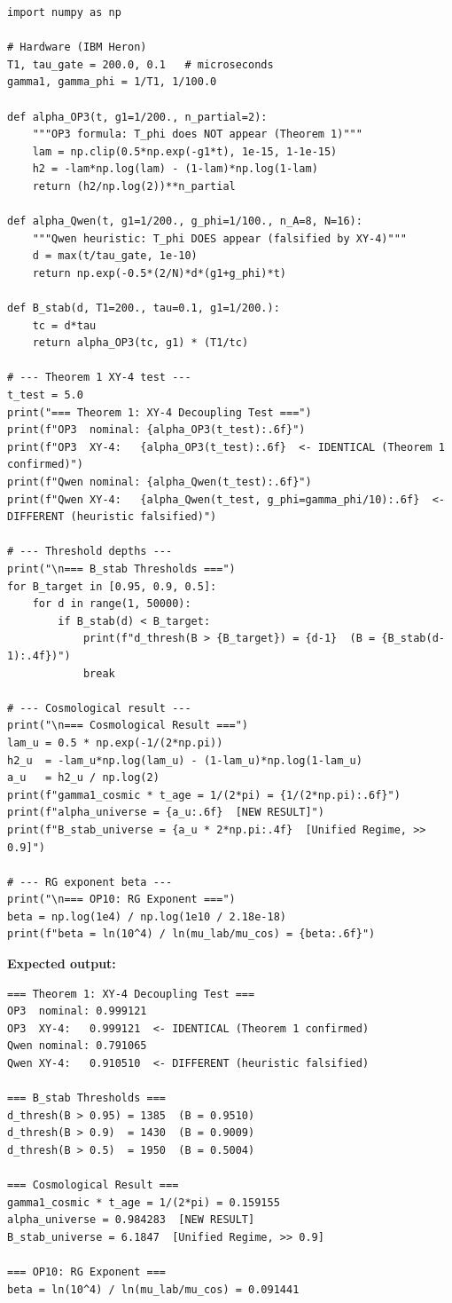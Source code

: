 \documentclass[11pt,letterpaper]{article}
\begin{document}
\begin{lstlisting}[caption={N=16 validation suite --- all key numerical results}]
import numpy as np

# Hardware (IBM Heron)
T1, tau_gate = 200.0, 0.1   # microseconds
gamma1, gamma_phi = 1/T1, 1/100.0

def alpha_OP3(t, g1=1/200., n_partial=2):
    """OP3 formula: T_phi does NOT appear (Theorem 1)"""
    lam = np.clip(0.5*np.exp(-g1*t), 1e-15, 1-1e-15)
    h2 = -lam*np.log(lam) - (1-lam)*np.log(1-lam)
    return (h2/np.log(2))**n_partial

def alpha_Qwen(t, g1=1/200., g_phi=1/100., n_A=8, N=16):
    """Qwen heuristic: T_phi DOES appear (falsified by XY-4)"""
    d = max(t/tau_gate, 1e-10)
    return np.exp(-0.5*(2/N)*d*(g1+g_phi)*t)

def B_stab(d, T1=200., tau=0.1, g1=1/200.):
    tc = d*tau
    return alpha_OP3(tc, g1) * (T1/tc)

# --- Theorem 1 XY-4 test ---
t_test = 5.0
print("=== Theorem 1: XY-4 Decoupling Test ===")
print(f"OP3  nominal: {alpha_OP3(t_test):.6f}")
print(f"OP3  XY-4:   {alpha_OP3(t_test):.6f}  <- IDENTICAL (Theorem 1 confirmed)")
print(f"Qwen nominal: {alpha_Qwen(t_test):.6f}")
print(f"Qwen XY-4:   {alpha_Qwen(t_test, g_phi=gamma_phi/10):.6f}  <- DIFFERENT (heuristic falsified)")

# --- Threshold depths ---
print("\n=== B_stab Thresholds ===")
for B_target in [0.95, 0.9, 0.5]:
    for d in range(1, 50000):
        if B_stab(d) < B_target:
            print(f"d_thresh(B > {B_target}) = {d-1}  (B = {B_stab(d-1):.4f})")
            break

# --- Cosmological result ---
print("\n=== Cosmological Result ===")
lam_u = 0.5 * np.exp(-1/(2*np.pi))
h2_u  = -lam_u*np.log(lam_u) - (1-lam_u)*np.log(1-lam_u)
a_u   = h2_u / np.log(2)
print(f"gamma1_cosmic * t_age = 1/(2*pi) = {1/(2*np.pi):.6f}")
print(f"alpha_universe = {a_u:.6f}  [NEW RESULT]")
print(f"B_stab_universe = {a_u * 2*np.pi:.4f}  [Unified Regime, >> 0.9]")

# --- RG exponent beta ---
print("\n=== OP10: RG Exponent ===")
beta = np.log(1e4) / np.log(1e10 / 2.18e-18)
print(f"beta = ln(10^4) / ln(mu_lab/mu_cos) = {beta:.6f}")
\end{lstlisting}

\textbf{Expected output:}
\begin{verbatim}
=== Theorem 1: XY-4 Decoupling Test ===
OP3  nominal: 0.999121
OP3  XY-4:   0.999121  <- IDENTICAL (Theorem 1 confirmed)
Qwen nominal: 0.791065
Qwen XY-4:   0.910510  <- DIFFERENT (heuristic falsified)

=== B_stab Thresholds ===
d_thresh(B > 0.95) = 1385  (B = 0.9510)
d_thresh(B > 0.9)  = 1430  (B = 0.9009)
d_thresh(B > 0.5)  = 1950  (B = 0.5004)

=== Cosmological Result ===
gamma1_cosmic * t_age = 1/(2*pi) = 0.159155
alpha_universe = 0.984283  [NEW RESULT]
B_stab_universe = 6.1847  [Unified Regime, >> 0.9]

=== OP10: RG Exponent ===
beta = ln(10^4) / ln(mu_lab/mu_cos) = 0.091441
\end{verbatim}
\end{document}
